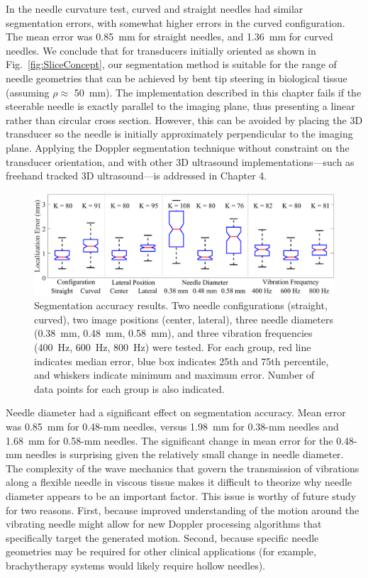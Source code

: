 In the needle curvature test, curved and straight needles had similar segmentation errors, with somewhat higher errors in the curved configuration. The mean error was 0.85~mm for straight needles, and 1.36~mm for curved needles. We conclude that for transducers initially oriented as shown in Fig.~\ref{fig:SliceConcept}, our segmentation method is suitable for the range of needle geometries that can be achieved by bent tip steering in biological tissue (assuming $\rho \approx$ 50~mm). The implementation described in this chapter fails if the steerable needle is exactly parallel to the imaging plane, thus presenting a linear rather than circular cross section. However, this can be avoided by placing the 3D transducer so the needle is initially approximately perpendicular to the imaging plane. Applying the Doppler segmentation technique without constraint on the transducer orientation, and with other 3D ultrasound implementations---such as freehand tracked 3D ultrasound---is addressed in Chapter 4.

\begin{figure}[!t]
\centering
\includegraphics[width=\textwidth]{Images/Chapter2/SegmentationAccuracy/SegmentationAccuracy}%
\caption[Doppler segmentation accuracy results]{Segmentation accuracy results. Two needle configurations (straight, curved), two image positions (center, lateral), three needle diameters (0.38~mm, 0.48~mm, 0.58~mm), and three vibration frequencies (400~Hz, 600~Hz, 800~Hz) were tested. For each group, red line indicates median error, blue box indicates 25th and 75th percentile, and whiskers indicate minimum and maximum error. Number of data points for each group is also indicated.}
\label{fig:SegmentationError}
\end{figure}

Needle diameter had a significant effect on segmentation accuracy. Mean error was 0.85~mm for 0.48-mm needles, versus 1.98~mm for 0.38-mm needles and 1.68~mm for 0.58-mm needles. The significant change in mean error for the 0.48-mm needles is surprising given the relatively small change in needle diameter. The complexity of the wave mechanics that govern the transmission of vibrations along a flexible needle in viscous tissue makes it difficult to theorize why needle diameter appears to be an important factor. This issue is worthy of future study for two reasons. First, because improved understanding of the motion around the vibrating needle might allow for new Doppler processing algorithms that specifically target the generated motion. Second, because specific needle geometries may be required for other clinical applications (for example, brachytherapy systems would likely require hollow needles).

